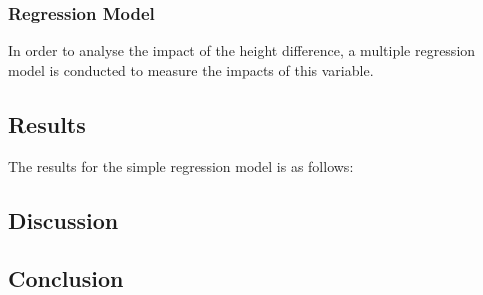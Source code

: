 \documentclass[
  letterpaper,
  DIV=11,
  numbers=noendperiod]{scrartcl}
\begin{document}
\hypertarget{regression-model}{%
\subsubsection{Regression Model}\label{regression-model}}

In order to analyse the impact of the height difference, a multiple
regression model is conducted to measure the impacts of this variable.

\hypertarget{results}{%
\subsection{Results}\label{results}}

The results for the simple regression model is as follows:

\hypertarget{discussion}{%
\subsection{Discussion}\label{discussion}}

\hypertarget{conclusion}{%
\subsection{Conclusion}\label{conclusion}}
\end{document}
